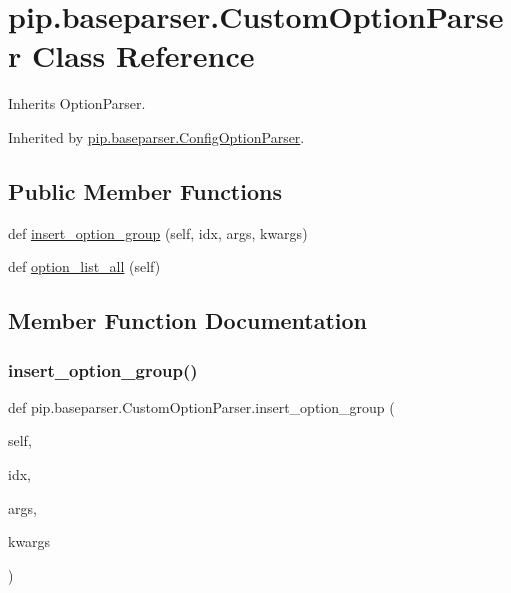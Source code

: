 \hypertarget{classpip_1_1baseparser_1_1_custom_option_parser}{}\section{pip.\+baseparser.\+Custom\+Option\+Parser Class Reference}
\label{classpip_1_1baseparser_1_1_custom_option_parser}


Inherits Option\+Parser.



Inherited by \hyperlink{classpip_1_1baseparser_1_1_config_option_parser}{pip.\+baseparser.\+Config\+Option\+Parser}.

\subsection*{Public Member Functions}
\begin{DoxyCompactItemize}
\item 
def \hyperlink{classpip_1_1baseparser_1_1_custom_option_parser_a8ddac9db87b0e94814ef16238bee717f}{insert\+\_\+option\+\_\+group} (self, idx, args, kwargs)
\item 
def \hyperlink{classpip_1_1baseparser_1_1_custom_option_parser_a77293828b350e872ae1f6c69d2d239f9}{option\+\_\+list\+\_\+all} (self)
\end{DoxyCompactItemize}


\subsection{Member Function Documentation}
\mbox{\label{classpip_1_1baseparser_1_1_custom_option_parser_a8ddac9db87b0e94814ef16238bee717f}} 
\subsubsection{\texorpdfstring{insert\+\_\+option\+\_\+group()}{insert\_option\_group()}}
{\footnotesize\ttfamily def pip.\+baseparser.\+Custom\+Option\+Parser.\+insert\+\_\+option\+\_\+group (\begin{DoxyParamCaption}\item[{}]{self,  }\item[{}]{idx,  }\item[{}]{args,  }\item[{}]{kwargs }\end{DoxyParamCaption})}

